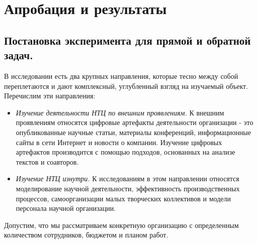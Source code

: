\chapter{Апробация и результаты}
\label{chapter:experiment}

\section{Постановка эксперимента для прямой и обратной задач.}
В исследовании есть два крупных направления, которые тесно между собой переплетаются и дают комплексный, углубленный взгляд на изучаемый объект.
Перечислим эти направления: 

\begin{itemize}
\item \textit{Изучение деятельности НТЦ по внешним проявлениям.} 
К внешним проявлениям относятся цифровые артефакты деятельности организации - это опубликованные научные статьи, материалы конференций, информационные сайты в сети Интернет и новости о компании.  
Изучение цифровых артефактов производится с помощью подходов, основанных на анализе текстов и соавторов. 
\item \textit{Изучение НТЦ изнутри.} 
К исследованиям в этом направлении относятся моделирование научной деятельности, эффективность производственных процессов, самоорганизации малых творческих коллективов и модели персонала научной организации.
\end{itemize}

Допустим, что мы рассматриваем конкретную организацию с определенным
количеством сотрудников, бюджетом и планом работ. 

